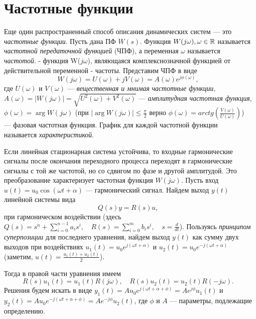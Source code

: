 \documentclass[../../TAU.tex]{subfiles}
\begin{document}
\section{Частотные функции} %
    Еще один распространенный способ описания динамических систем --- это {\it частотные функции}.
    Пусть дана ПФ $W(s)$. Функция 
    $W(j\omega), \omega\in\mathbb{R}$ 
    называется {\it частотной передаточной функцией} (ЧПФ), а переменная $\omega$ называется {\it частотой}.
     - функция W($j\omega$), являющаяся комплекснозначной функцией от действительной переменной - частоты. 
    Представим ЧПФ в виде
    $$
        W(j\omega) = U(\omega) + jV(\omega) = A(\omega)e^{j\phi(\omega)},
    $$
    где 
    $U(\omega)$ и $V(\omega)$ 
    --- {\it вещественная и мнимая частотные функции}, 
    $A(\omega) = |W(j\omega)| = \sqrt{U^2(\omega)+V^2(\omega)}$ 
    --- {\it амплитудная частотная функция}, 
    $\phi(\omega) = \arg{W(j\omega)}$ (при 
    $|\arg{W(j\omega)}| \le \frac{\pi}{2}$ верно 
    $\phi(\omega) = arctg\left(\frac{V(\omega)}{U(\omega)}\right)$) 
    --- фазовая частотная функция.
    График для каждой частотной функции называется {\it характеристикой}.\par
    Если линейная стационарная система устойчива, то входные гармонические сигналы после окончания переходного процесса переходят в гармонические сигналы с той же частотой, но со сдвигом по фазе и другой амплитудой. Это преобразование характеризует частотная функция 
    $W(j\omega)$.
    Пусть вход 
    $u(t) = u_0 \cos(\omega t + \alpha)$ 
    --- гармонический сигнал. Найдем выход $y(t)$ линейной системы вида
    \begin{equation}\label{EQ_ODU_SYM_2}
        Q(s)y = R(s)u,
    \end{equation}
    при гармоническом воздействии (здесь 
    $Q(s) = s^n + \sum_{i=0}^{n-1}a_is^i,\quad R(s) = \sum_{i=0}^{m}b_is^i, \quad s=\frac{d}{dt}$). 
    Пользуясь {\it принципом суперпозиции} для последнего уравнения, найдем выход $y(t)$ как сумму двух выходов при воздействиях 
    $u_1(t) = u_0e^{j(\omega t+\alpha)}$ и 
    $u_2(t) = u_0e^{-j(\omega t+\alpha)}$ (заметим, 
    $u(t) = \frac{u_1(t)+u_2(t)}{2}$).\par
    Тогда в правой части уравнения имеем
    $$
        R(s)u_1(t) = u_1(t)R(j\omega),\quad R(s)u_2(t) = u_2(t)R(-j\omega).
    $$
    Решения будем искать в виде $y_1(t) = A u_0e^{j(\omega t + \alpha + \phi)} = Ae^{j\phi}u_1(t)$ и $y_2(t) = A u_0e^{-j(\omega t + \alpha + \phi)} = Ae^{-j\phi}u_2(t)$, где $\phi$ и $A$ --- параметры, подлежащие определению.
\end{document}
